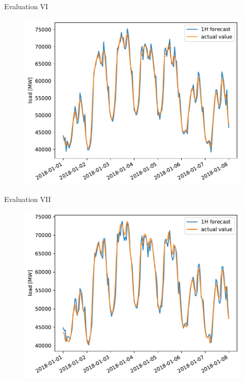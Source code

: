 \documentclass[t,xcolor={table},fleqn]{beamer}
\begin{document}
\begin{frame}{Evaluation VI}


\begin{figure}[h!]%
\centering
\includegraphics[height=\textheight]{../doc/plots/ARMAXfc/ARMAX_p2q2_data2015to2017_fcto2018123100_plot_range2018010100_2018010800}%
\end{figure}

\end{frame}


\begin{frame}{Evaluation VII}


\begin{figure}[h!]%
\centering
\includegraphics[height=\textheight]{../doc/plots/ARMAXfc/ARMAX_p2q2_data2015to2017_fcto2018123100_t2m_top10_plot_range2018010100_2018010800}%
\end{figure}

\end{frame}
\end{document}
